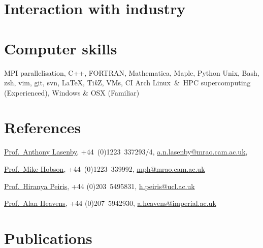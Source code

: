 \documentclass[11pt,a4paper,sans]{moderncv}
\begin{document}
\section{Interaction with industry}


\section{Computer skills}
 {MPI parallelisation, C++, FORTRAN, Mathematica, Maple, Python}
   {Unix, Bash, zsh, vim, git, svn, \LaTeX, Ti\textit{k}Z, VMs, CI}
          {Arch Linux~\&~HPC supercomputing (Experienced), Windows \& OSX (Familiar)}


\section{References}
\href{https://www.kicc.cam.ac.uk/directory/anl1000}{Prof.\ Anthony Lasenby}, {+44~(0)1223~337293/4}, \href{mailto:a.n.lasenby@mrao.cam.ac.uk}{a.n.lasenby@mrao.cam.ac.uk}, 

\href{https://www.phy.cam.ac.uk/directory/hobsonm}{Prof.\ Mike Hobson}, {+44~(0)1223~339992}, \href{mailto:mph@mrao.cam.ac.uk}{mph@mrao.cam.ac.uk} 

\href{https://www.ucl.ac.uk/cosmoparticle/hiranya-peiris}{Prof.\ Hiranya Peiris}, {+44 (0)203~5495831}, \href{mailto:h.peiris@ucl.ac.uk}{h.peiris@ucl.ac.uk} 


\href{https://www.imperial.ac.uk/people/a.heavens}{Prof.\ Alan Heavens}, {+44 (0)207~5942930}, \href{mailto:a.heavens@imperial.ac.uk}{a.heavens@imperial.ac.uk} 

\section{Publications}


{\small
{}
}
\end{document}
